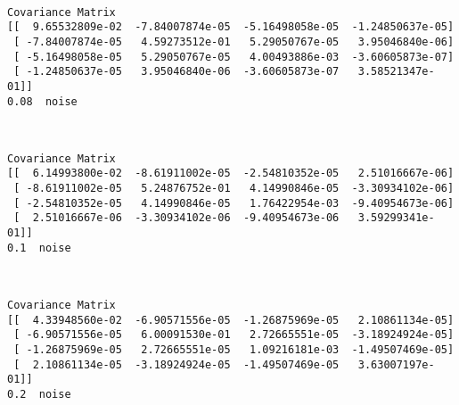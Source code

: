 \documentclass{article}
\begin{document}
    \begin{center}
    \end{center}
    { \hspace*{\fill} \\}
    
    \begin{Verbatim}[commandchars=\\\{\}]
Covariance Matrix
[[  9.65532809e-02  -7.84007874e-05  -5.16498058e-05  -1.24850637e-05]
 [ -7.84007874e-05   4.59273512e-01   5.29050767e-05   3.95046840e-06]
 [ -5.16498058e-05   5.29050767e-05   4.00493886e-03  -3.60605873e-07]
 [ -1.24850637e-05   3.95046840e-06  -3.60605873e-07   3.58521347e-01]]
0.08  noise
    \end{Verbatim}

    \begin{center}
    \end{center}
    { \hspace*{\fill} \\}
    
    \begin{Verbatim}[commandchars=\\\{\}]
Covariance Matrix
[[  6.14993800e-02  -8.61911002e-05  -2.54810352e-05   2.51016667e-06]
 [ -8.61911002e-05   5.24876752e-01   4.14990846e-05  -3.30934102e-06]
 [ -2.54810352e-05   4.14990846e-05   1.76422954e-03  -9.40954673e-06]
 [  2.51016667e-06  -3.30934102e-06  -9.40954673e-06   3.59299341e-01]]
0.1  noise
    \end{Verbatim}

    \begin{center}
    \end{center}
    { \hspace*{\fill} \\}
    
    \begin{Verbatim}[commandchars=\\\{\}]
Covariance Matrix
[[  4.33948560e-02  -6.90571556e-05  -1.26875969e-05   2.10861134e-05]
 [ -6.90571556e-05   6.00091530e-01   2.72665551e-05  -3.18924924e-05]
 [ -1.26875969e-05   2.72665551e-05   1.09216181e-03  -1.49507469e-05]
 [  2.10861134e-05  -3.18924924e-05  -1.49507469e-05   3.63007197e-01]]
0.2  noise
    \end{Verbatim}
\end{document}
